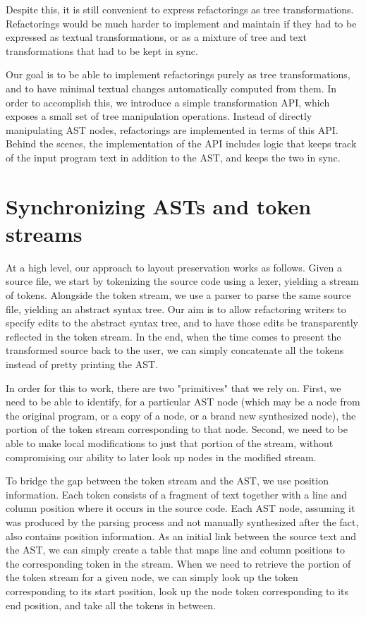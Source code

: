 Despite this, it is still convenient to express refactorings as tree
transformations. Refactorings would be much harder to implement and maintain if
they had to be expressed as textual transformations, or as a mixture of tree
and text transformations that had to be kept in sync.

Our goal is to be able to implement refactorings purely as tree
transformations, and to have minimal textual changes automatically computed
from them. In order to accomplish this, we introduce a simple transformation
API, which exposes a small set of tree manipulation operations. Instead of
directly manipulating AST nodes, refactorings are implemented in terms of this
API. Behind the scenes, the implementation of the API includes logic that keeps
track of the input program text in addition to the AST, and keeps the two in
sync.

\section{Synchronizing ASTs and token streams}

At a high level, our approach to layout preservation works as follows. Given a
\matlab source file, we start by tokenizing the source code using a \matlab
lexer, yielding a stream of tokens. Alongside the token stream, we use a
\matlab parser to parse the same source file, yielding an abstract syntax tree.
Our aim is to allow refactoring writers to specify edits to the abstract syntax
tree, and to have those edits be transparently reflected in the token stream.
In the end, when the time comes to present the transformed source back to the
user, we can simply concatenate all the tokens instead of pretty printing the
AST.

In order for this to work, there are two "primitives" that we rely on. First,
we need to be able to identify, for a particular AST node (which may be a node
from the original program, or a copy of a node, or a brand new synthesized
node), the portion of the token stream corresponding to that node. Second, we
need to be able to make local modifications to just that portion of the stream,
without compromising our ability to later look up nodes in the modified stream.

To bridge the gap between the token stream and the AST, we use position
information. Each token consists of a fragment of text together with a line and
column position where it occurs in the source code. Each AST node, assuming it
was produced by the parsing process and not manually synthesized after the
fact, also contains position information. As an initial link between the source
text and the AST, we can simply create a table that maps line and column
positions to the corresponding token in the stream. When we need to retrieve
the portion of the token stream for a given node, we can simply look up the
token corresponding to its start position, look up the node token corresponding
to its end position, and take all the tokens in between.

